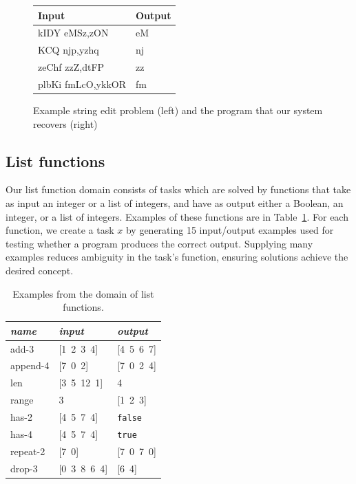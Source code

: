 \documentclass{article}
\begin{document}
\begin{figure}
  \begin{tabular}{ll}\toprule
    Input&Output\\\midrule
    kIDY eMSz,zON& 	eM\\
KCQ njp,yzhq 	&nj\\
zeChf zzZ,dtFP 	&zz\\
plbKi fmLcO,ykkOR 	&fm    \\\bottomrule
  \end{tabular}
  \caption{Example string edit problem (left) and the program that our system recovers (right)}\label{exampleTextProblem}
  \end{figure}

\subsection{List functions}
Our list function domain consists of tasks which are solved by functions
that take as input an integer or a list of integers, and have as output
either a Boolean, an integer, or a list of integers. Examples of these
functions are in Table~\ref{listexamples}. For each function, we create a
task $x$ by generating 15 input/output examples used for testing whether a
program produces the correct output. Supplying many examples reduces
ambiguity in the task's function, ensuring solutions achieve the desired
concept.

\begin{table}
\centering
\begin{tabular}{| l | l | l |}
  \hline
  \emph{name} & \emph{input} & \emph{output} \\
  \hline
  add-3 & [1\, 2\, 3\, 4] & [4\, 5\, 6\, 7] \\
  append-4 & [7\, 0\, 2] & [7\, 0\, 2\, 4] \\
  len & [3\, 5\, 12\, 1] & 4 \\
  range & 3 & [1\, 2\, 3] \\
  has-2 & [4\, 5\, 7\, 4] & \texttt{false} \\
  has-4 & [4\, 5\, 7\, 4] & \texttt{true} \\
  repeat-2 & [7\, 0] & [7\, 0\, 7\, 0] \\
  drop-3 & [0\, 3\, 8\, 6\, 4] & [6\, 4] \\
  \hline
\end{tabular}
\caption{Examples from the domain of list functions.}
\label{listexamples}
\end{table}
\end{document}
